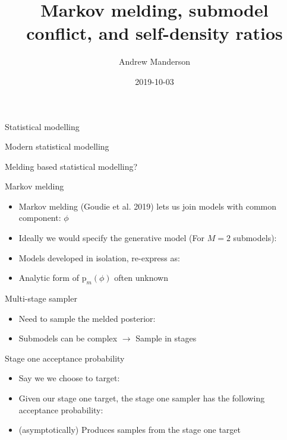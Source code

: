 \documentclass[10pt,ignorenonframetext,]{beamer}
\title{Markov melding, submodel conflict, and self-density ratios}
\author{Andrew Manderson}
\date{2019-10-03}
\providecommand{\tightlist}{%
  \setlength{\itemsep}{0pt}\setlength{\parskip}{0pt}}
\newcommand{\pd}{\text{p}}
\newcommand{\modelindex}{m}
\begin{document}
\frame{\titlepage}

\begin{frame}{Statistical modelling}



\end{frame}

\begin{frame}{Modern statistical modelling}



\end{frame}

\begin{frame}{Melding based statistical modelling?}



\end{frame}

\begin{frame}{Markov melding}

\begin{itemize}
\tightlist
\item
  Markov melding (Goudie et al. 2019) lets us join models with common
  component: \(\phi\)
\item
  Ideally we would specify the generative model (For \(M = 2\)
  submodels): 
\item
  Models developed in isolation, re-express as:
  
\item
  Analytic form of \(\pd_{\modelindex}(\phi)\) often unknown
\end{itemize}

\end{frame}

\begin{frame}{Multi-stage sampler}

\begin{itemize}
\tightlist
\item
  Need to sample the melded posterior:
  
\item
  Submodels can be complex \(\rightarrow\) Sample in stages
\end{itemize}

\end{frame}

\begin{frame}{Stage one acceptance probability}

\begin{itemize}
\tightlist
\item
  Say we we choose to target:
  
\item
  Given our stage one target, the stage one sampler has the following
  acceptance probability:
   
\item
  (asymptotically) Produces samples from the stage one target
\end{itemize}

\end{frame}
\end{document}
